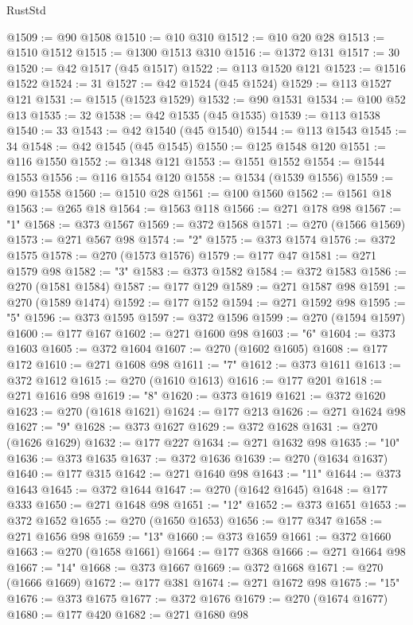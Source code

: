 \begin{lexlean}{RustStd}
\begin{coremodule}
@1509 := @90 @1508
@1510 := @10 @310
@1512 := @10 @20 @28
@1513 := @1510 @1512
@1515 := @1300 @1513 @310
@1516 := @1372 @131
@1517 := 30
@1520 := @42 @1517 (@45 @1517)
@1522 := @113 @1520 @121
@1523 := @1516 @1522
@1524 := 31
@1527 := @42 @1524 (@45 @1524)
@1529 := @113 @1527 @121
@1531 := @1515 (@1523 @1529)
@1532 := @90 @1531
@1534 := @100 @52 @13
@1535 := 32
@1538 := @42 @1535 (@45 @1535)
@1539 := @113 @1538
@1540 := 33
@1543 := @42 @1540 (@45 @1540)
@1544 := @113 @1543
@1545 := 34
@1548 := @42 @1545 (@45 @1545)
@1550 := @125 @1548 @120
@1551 := @116 @1550
@1552 := @1348 @121
@1553 := @1551 @1552
@1554 := @1544 @1553
@1556 := @116 @1554 @120
@1558 := @1534 (@1539 @1556)
@1559 := @90 @1558
@1560 := @1510 @28
@1561 := @100 @1560
@1562 := @1561 @18
@1563 := @265 @18
@1564 := @1563 @118
@1566 := @271 @178 @98
@1567 := "1"
@1568 := @373 @1567
@1569 := @372 @1568
@1571 := @270 (@1566 @1569)
@1573 := @271 @567 @98
@1574 := "2"
@1575 := @373 @1574
@1576 := @372 @1575
@1578 := @270 (@1573 @1576)
@1579 := @177 @47
@1581 := @271 @1579 @98
@1582 := "3"
@1583 := @373 @1582
@1584 := @372 @1583
@1586 := @270 (@1581 @1584)
@1587 := @177 @129
@1589 := @271 @1587 @98
@1591 := @270 (@1589 @1474)
@1592 := @177 @152
@1594 := @271 @1592 @98
@1595 := "5"
@1596 := @373 @1595
@1597 := @372 @1596
@1599 := @270 (@1594 @1597)
@1600 := @177 @167
@1602 := @271 @1600 @98
@1603 := "6"
@1604 := @373 @1603
@1605 := @372 @1604
@1607 := @270 (@1602 @1605)
@1608 := @177 @172
@1610 := @271 @1608 @98
@1611 := "7"
@1612 := @373 @1611
@1613 := @372 @1612
@1615 := @270 (@1610 @1613)
@1616 := @177 @201
@1618 := @271 @1616 @98
@1619 := "8"
@1620 := @373 @1619
@1621 := @372 @1620
@1623 := @270 (@1618 @1621)
@1624 := @177 @213
@1626 := @271 @1624 @98
@1627 := "9"
@1628 := @373 @1627
@1629 := @372 @1628
@1631 := @270 (@1626 @1629)
@1632 := @177 @227
@1634 := @271 @1632 @98
@1635 := "10"
@1636 := @373 @1635
@1637 := @372 @1636
@1639 := @270 (@1634 @1637)
@1640 := @177 @315
@1642 := @271 @1640 @98
@1643 := "11"
@1644 := @373 @1643
@1645 := @372 @1644
@1647 := @270 (@1642 @1645)
@1648 := @177 @333
@1650 := @271 @1648 @98
@1651 := "12"
@1652 := @373 @1651
@1653 := @372 @1652
@1655 := @270 (@1650 @1653)
@1656 := @177 @347
@1658 := @271 @1656 @98
@1659 := "13"
@1660 := @373 @1659
@1661 := @372 @1660
@1663 := @270 (@1658 @1661)
@1664 := @177 @368
@1666 := @271 @1664 @98
@1667 := "14"
@1668 := @373 @1667
@1669 := @372 @1668
@1671 := @270 (@1666 @1669)
@1672 := @177 @381
@1674 := @271 @1672 @98
@1675 := "15"
@1676 := @373 @1675
@1677 := @372 @1676
@1679 := @270 (@1674 @1677)
@1680 := @177 @420
@1682 := @271 @1680 @98

\end{coremodule}
\end{lexlean}
